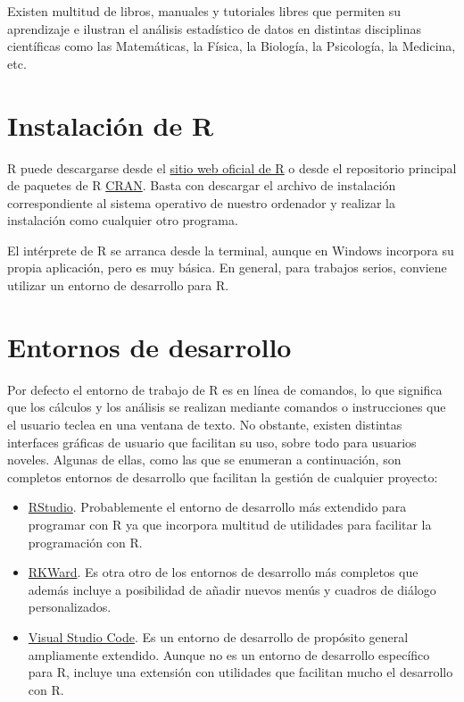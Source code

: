 \documentclass[
  a4paper,
]{scrreport}
\theoremstyle{definition}
\theoremstyle{definition}
\theoremstyle{remark}
\begin{document}
Existen multitud de libros, manuales y tutoriales libres que permiten su
aprendizaje e ilustran el análisis estadístico de datos en distintas
disciplinas científicas como las Matemáticas, la Física, la Biología, la
Psicología, la Medicina, etc.

\section{Instalación de R}\label{instalaciuxf3n-de-r}

R puede descargarse desde el \href{https://www.r-project.org/}{sitio web
oficial de R} o desde el repositorio principal de paquetes de R
\href{https://cran.r-project.org/}{CRAN}. Basta con descargar el archivo
de instalación correspondiente al sistema operativo de nuestro ordenador
y realizar la instalación como cualquier otro programa.

El intérprete de R se arranca desde la terminal, aunque en Windows
incorpora su propia aplicación, pero es muy básica. En general, para
trabajos serios, conviene utilizar un entorno de desarrollo para R.

\section{Entornos de desarrollo}\label{entornos-de-desarrollo}

Por defecto el entorno de trabajo de R es en línea de comandos, lo que
significa que los cálculos y los análisis se realizan mediante comandos
o instrucciones que el usuario teclea en una ventana de texto. No
obstante, existen distintas interfaces gráficas de usuario que facilitan
su uso, sobre todo para usuarios noveles. Algunas de ellas, como las que
se enumeran a continuación, son completos entornos de desarrollo que
facilitan la gestión de cualquier proyecto:

\begin{itemize}
\item
  \href{https://www.rstudio.com/}{RStudio}. Probablemente el entorno de
  desarrollo más extendido para programar con R ya que incorpora
  multitud de utilidades para facilitar la programación con R.
\item
  \href{https://rkward.kde.org}{RKWard}. Es otra otro de los entornos de
  desarrollo más completos que además incluye a posibilidad de añadir
  nuevos menús y cuadros de diálogo personalizados.
\item
  \href{https://code.visualstudio.com/}{Visual Studio Code}. Es un
  entorno de desarrollo de propósito general ampliamente extendido.
  Aunque no es un entorno de desarrollo específico para R, incluye una
  extensión con utilidades que facilitan mucho el desarrollo con R.
\end{itemize}
\end{document}
